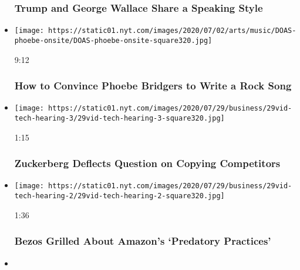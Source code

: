 \begin{itemize}
{  \subsubsection{Trump and George Wallace Share a Speaking
  Style}\label{trump-and-george-wallace-share-a-speaking-style}}
\item
  \href{https://www.nytimes.com/video/arts/music/100000007258359/phoebe-bridgers-kyoto.html?action=click\&module=video-series-bar\&region=header\&pgtype=Article\&playlistId=video/latest-video}{}

  \texttt{[image: https://static01.nyt.com/images/2020/07/02/arts/music/DOAS-phoebe-onsite/DOAS-phoebe-onsite-square320.jpg]}

  9:12

  \hypertarget{how-to-convince-phoebe-bridgers-to-write-a-rock-song}{%
  \subsubsection{How to Convince Phoebe Bridgers to Write a Rock
  Song}\label{how-to-convince-phoebe-bridgers-to-write-a-rock-song}}
\item
  \href{https://www.nytimes.com/video/us/politics/100000007263272/zuckerberg-jayapal-facebook.html?action=click\&module=video-series-bar\&region=header\&pgtype=Article\&playlistId=video/latest-video}{}

  \texttt{[image: https://static01.nyt.com/images/2020/07/29/business/29vid-tech-hearing-3/29vid-tech-hearing-3-square320.jpg]}

  1:15

  \hypertarget{zuckerberg-deflects-question-on-copying-competitors}{%
  \subsubsection{Zuckerberg Deflects Question on Copying
  Competitors}\label{zuckerberg-deflects-question-on-copying-competitors}}
\item
  \href{https://www.nytimes.com/video/us/100000007263183/bezos-amazon-predatory-practices.html?action=click\&module=video-series-bar\&region=header\&pgtype=Article\&playlistId=video/latest-video}{}

  \texttt{[image: https://static01.nyt.com/images/2020/07/29/business/29vid-tech-hearing-2/29vid-tech-hearing-2-square320.jpg]}

  1:36

  \hypertarget{bezos-grilled-about-amazons-predatory-practices}{%
  \subsubsection{Bezos Grilled About Amazon's `Predatory
  Practices'}\label{bezos-grilled-about-amazons-predatory-practices}}
\item
  \href{https://www.nytimes.com/video/us/politics/100000007263148/google-data-privacy.html?action=click\&module=video-series-bar\&region=header\&pgtype=Article\&playlistId=video/latest-video}{}


\end{itemize}
